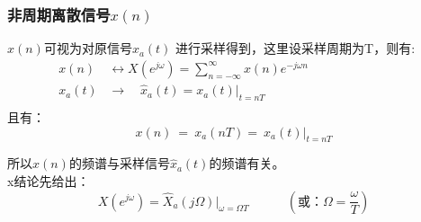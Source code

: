 \documentclass[notheorems,compress,mathserif,table]{beamer}
\begin{document}
\begin{frame}[shrink]\frametitle{非周期离散信号$x(n)$}%

$x(n)$可视为对原信号$x_a(t)$ 进行采样得到，这里设采样周期为T，则有:
  \begin{equation*}
        \begin{split}
             x(n) \:  &\longleftrightarrow   X(e^{j\omega}) = \sum_{n=-\infty}^{\infty}x(n)e^{-j\omega n}\quad\quad\quad\quad\quad\quad\quad\quad\\
             x_a(t)   &\longrightarrow     \quad  \hat{x}_a(t) = x_a(t)|_{t=nT}\\
        \end{split}
        \end{equation*}
        且有：
$$                     x(n)\:   =\:  x_a(nT)  =\: x_a(t)|_{t=nT}$$

        所以$x(n)$的频谱与采样信号$\hat{x}_a(t)$的频谱有关。\\
        x结论先给出：
        $$ X(e^{j\omega})  = \hat{X}_a(j\Omega)\big|_{\omega = \Omega T}\quad\quad\quad(\mbox{或：}\Omega = \frac{\omega}{T})$$%
\end{frame}
\end{document}
